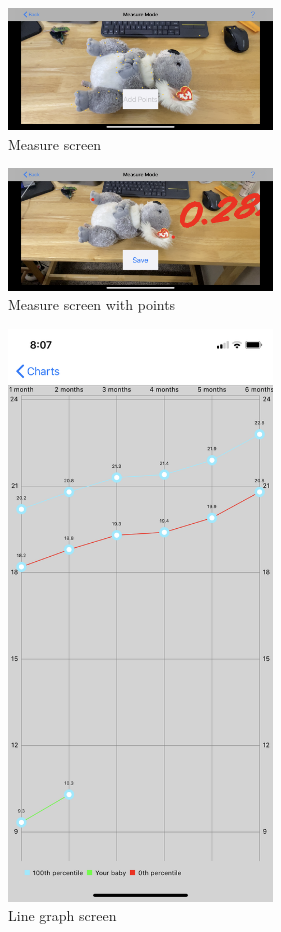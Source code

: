 \documentclass[onecolumn, draftclsnofoot,10pt, compsoc]{IEEEtran}
\begin{document}
\begin{figure}[h!]
\centering
\includegraphics[width=70mm]{./images/measure-screen.png}
\caption{Measure screen}
\end{figure}

\begin{figure}[h!]
\centering
\includegraphics[width=70mm]{./images/measure-points-screen.png}
\caption{Measure screen with points}
\end{figure}

\begin{figure}[h!]
\centering
\includegraphics[width=70mm]{./images/line-graph-screen.png}
\caption{Line graph screen}
\end{figure}
\end{document}
